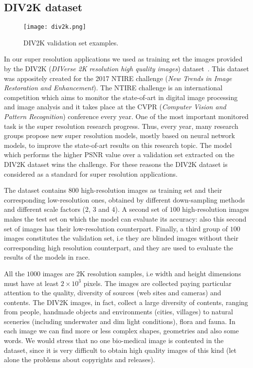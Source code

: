 \documentclass{standalone}
\begin{document}
\subsection[DIV2K dataset]{DIV2K dataset}\label{SR:div2k}

\begin{center}
\begin{figure}[htbp]
\centering
\texttt{[image: div2k.png]}
\caption{DIV2K validation set examples.
}
\label{fig:div2k}
\end{figure}
\end{center}

In our super resolution applications we used as training set the images provided by the DIV2K (\emph{DIVerse 2K resolution high quality images}) dataset~\cite{Agustsson_2017_CVPR_Workshops}.
This dataset was appositely created for the 2017 NTIRE challenge (\emph{New Trends in Image Restoration and Enhancement}).
The NTIRE challenge is an international competition which aims to monitor the state-of-art in digital image processing and image analysis and it takes place at the CVPR (\emph{Computer Vision and Pattern Recognition}) conference every year.
One of the most important monitored task is the super resolution research progress.
Thus, every year, many research groups propose new super resolution models, mostly based on neural network models, to improve the state-of-art results on this research topic.
The model which performs the higher PSNR value over a validation set extracted on the DIV2K dataset wins the challenge.
For these reasons the DIV2K dataset is considered as a standard for super resolution applications.

The dataset contains $800$ high-resolution images as training set and their corresponding low-resolution ones, obtained by different down-sampling methods and different scale factors ($2$, $3$ and $4$).
A second set of $100$ high-resolution images makes the test set on which the model can evaluate its accuracy: also this second set of images has their low-resolution counterpart.
Finally, a third group of $100$ images constitutes the validation set, i.e they are blinded images without their corresponding high resolution counterpart, and they are used to evaluate the results of the models in race.

All the $1000$ images are 2K resolution samples, i.e width and height dimensions must have at least $2\times10^3$ pixels.
The images are collected paying particular attention to the quality, diversity of sources (web sites and cameras) and contents.
The DIV2K images, in fact, collect a large diversity of contents, ranging from people, handmade objects and environments (cities, villages) to natural sceneries (including underwater and dim light conditions), flora and fauna.
In each image we can find more or less complex shapes, geometries and also some words.
We would stress that no one bio-medical image is contented in the dataset, since it is very difficult to obtain high quality images of this kind (let alone the problems about copyrights and releases).
\end{document}
